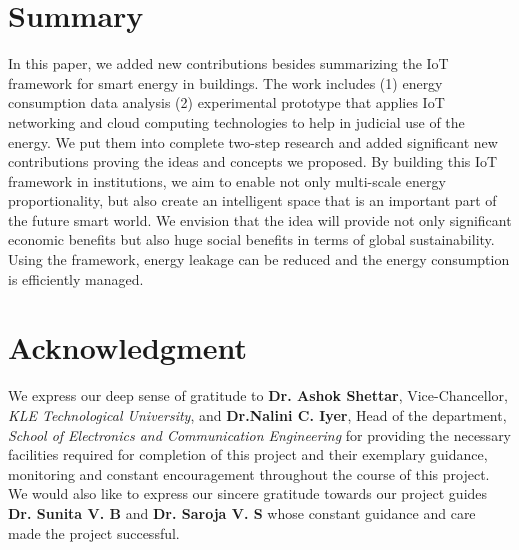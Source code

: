 \documentclass[journal]{IEEEtran}
\begin{document}
\section{Summary}
In this paper, we added new contributions besides summarizing the IoT framework for smart energy in buildings. The work includes (1) energy consumption data analysis (2) experimental prototype that applies IoT networking and cloud computing technologies to help in judicial use of the energy. We put them into complete two-step research and added significant new contributions proving the ideas and concepts we proposed. By building this IoT framework in institutions, we aim to enable not only multi-scale energy proportionality, but also create an intelligent space that is an important part of the future smart world. We envision that the idea will provide not only significant economic benefits but also huge social benefits in terms of global sustainability. Using the framework, energy leakage can be reduced and the energy consumption is efficiently managed.




\newpage
\section*{Acknowledgment}
We express our deep sense of gratitude to \textbf{Dr. Ashok Shettar}, Vice-Chancellor, \textit{KLE Technological University}, and \textbf{Dr.Nalini C. Iyer}, Head of the department, \textit{School of Electronics and Communication Engineering} for providing the necessary facilities required for completion of this project and their exemplary guidance, monitoring and constant encouragement throughout the course of this project. We would also like to express our sincere gratitude towards our project guides \textbf{Dr. Sunita V. B} and \textbf{Dr. Saroja V. S} whose constant guidance and care made the project successful.
\end{document}
